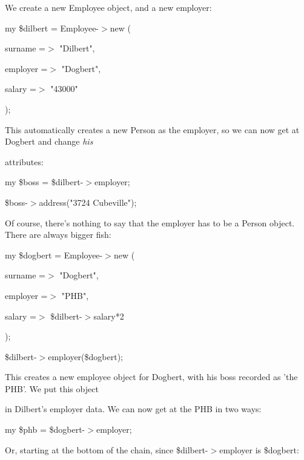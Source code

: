 \documentclass[a4paper,11pt]{book}
\begin{document}
\noindent 

\noindent We create a new Employee object, and a new employer:

\noindent 

\noindent 

\noindent my \$dilbert = Employee-$>$new (

\noindent surname =$>$ "Dilbert",

\noindent employer =$>$ "Dogbert",

\noindent salary =$>$ "43000"

\noindent );

\noindent 

\noindent This automatically creates a new Person as the employer, so we can now get at Dogbert and change \textit{his}

\noindent attributes:

\noindent 

\noindent 

\noindent my \$boss = \$dilbert-$>$employer;

\noindent \$boss-$>$address("3724 Cubeville");

\noindent 

\noindent Of course, there's nothing to say that the employer has to be a Person object. There are always bigger fish:

\noindent 

\noindent 

\noindent my \$dogbert = Employee-$>$new (

\noindent surname =$>$ "Dogbert",

\noindent employer =$>$ "PHB",

\noindent salary =$>$ \$dilbert-$>$salary*2

\noindent );

\noindent \$dilbert-$>$employer(\$dogbert);

\noindent 

\noindent This creates a new employee object for Dogbert, with his boss recorded as 'the PHB'. We put this object

\noindent in Dilbert's employer data. We can now get at the PHB in two ways:

\noindent 

\noindent 

\noindent my \$phb = \$dogbert-$>$employer;

\noindent 

\noindent Or, starting at the bottom of the chain, since \$dilbert-$>$employer is \$dogbert:
\end{document}
